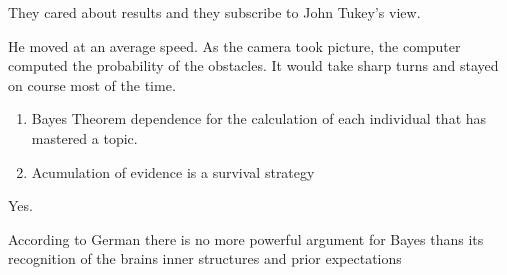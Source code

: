 \documentclass[12pt]{article}
\begin{document}

\begin{enumerate}

\begin{flushleft}
  They cared about results and they subscribe to John Tukey's view.
\end{flushleft}

\begin{flushleft}
    He moved at an average speed. As the camera took picture, the computer computed the probability of the obstacles. It would take sharp turns and 
    stayed on course most of the time.
\end{flushleft}

\begin{enumerate}
    \item Bayes Theorem dependence for the calculation of each individual that has mastered a topic. 
    \item Acumulation of evidence is a survival strategy
\end{enumerate}

\begin{flushleft}
    Yes.
\end{flushleft}

\begin{flushleft}
    According to German there is no more powerful argument for Bayes thans its recognition of the brains inner structures and prior expectations
\end{flushleft}

\end{enumerate}




\end{document}
